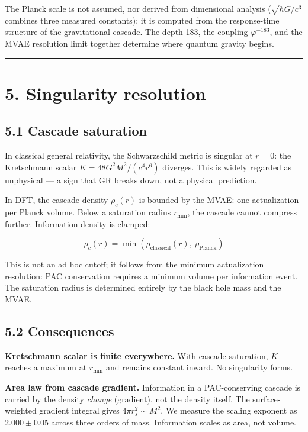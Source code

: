 \documentclass[11pt,a4paper]{article}
\begin{document}
The Planck scale is not assumed, nor derived from dimensional analysis ($\sqrt{\hbar G / c^3}$ combines three measured constants); it is computed from the response-time structure of the gravitational cascade. The depth 183, the coupling $\varphi^{-183}$, and the MVAE resolution limit together determine where quantum gravity begins.

\begin{center}\rule{0.5\linewidth}{0.4pt}\end{center}

\section*{5. Singularity resolution}

\subsection*{5.1 Cascade saturation}

In classical general relativity, the Schwarzschild metric is singular at $r = 0$: the Kretschmann scalar $K = 48 G^2 M^2 / (c^4 r^6)$ diverges. This is widely regarded as unphysical — a sign that GR breaks down, not a physical prediction.

In DFT, the cascade density $\rho_c(r)$ is bounded by the MVAE: one actualization per Planck volume. Below a saturation radius $r_{\text{min}}$, the cascade cannot compress further. Information density is clamped:

\[\rho_c(r) = \min\left(\rho_{\text{classical}}(r),\ \rho_{\text{Planck}}\right)\]

This is not an ad hoc cutoff; it follows from the minimum actualization resolution: PAC conservation requires a minimum volume per information event. The saturation radius is determined entirely by the black hole mass and the MVAE.

\subsection*{5.2 Consequences}

\textbf{Kretschmann scalar is finite everywhere.} With cascade saturation, $K$ reaches a maximum at $r_{\text{min}}$ and remains constant inward. No singularity forms.

\textbf{Area law from cascade gradient.} Information in a PAC-conserving cascade is carried by the density \emph{change} (gradient), not the density itself. The surface-weighted gradient integral gives $4\pi r_s^2 \sim M^2$. We measure the scaling exponent as $2.000 \pm 0.05$ across three orders of mass. Information scales as area, not volume.
\end{document}
